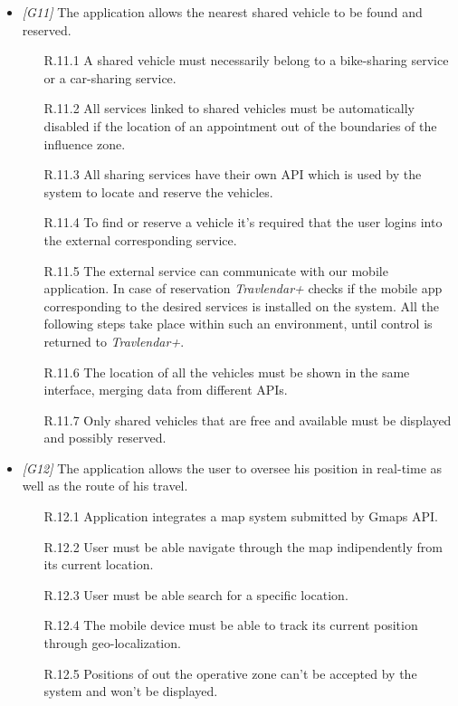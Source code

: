 \begin{itemize}
\begin{itemize}
		\end{itemize}


	\item \textit{[G11]} The application allows the nearest shared vehicle to be found and reserved.
		\begin{itemize}
			\item [R.11.1] A shared vehicle must necessarily belong to a bike-sharing service or a car-sharing service.
			\item [R.11.2] All services linked to shared vehicles must be automatically disabled if the location of an appointment out of the boundaries of the influence zone.
			\item [R.11.3] All sharing services have their own API which is used by the system to locate and reserve the vehicles.
			\item [R.11.4] To find or reserve a vehicle it's required that the user logins into the external corresponding service.
			\item [R.11.5] The external service can communicate with our mobile application. In case of reservation \textit{Travlendar+} checks if the mobile app corresponding to the desired services is installed on the system. All the following steps take place within such an environment, until control is returned to \textit{Travlendar+}.
			\item [R.11.6] The location of all the vehicles must be shown in the same interface, merging data from different APIs.
			\item[R.11.7] Only shared vehicles that are free and available must be displayed and possibly reserved.
		\end{itemize}


	\item \textit{[G12]} The application allows the user to oversee his position in real-time as well as the route of his travel.
		\begin{itemize}
			\item [R.12.1] Application integrates a map system submitted by Gmaps API.
			\item [R.12.2] User must be able navigate through the map indipendently from its current location.
			\item [R.12.3] User must be able search for a specific location.
			\item [R.12.4] The mobile device must be able to track its current position through geo-localization.
			\item [R.12.5] Positions of out the operative zone can't be accepted by the system and won't be displayed.
		\end{itemize}



\end{itemize}
